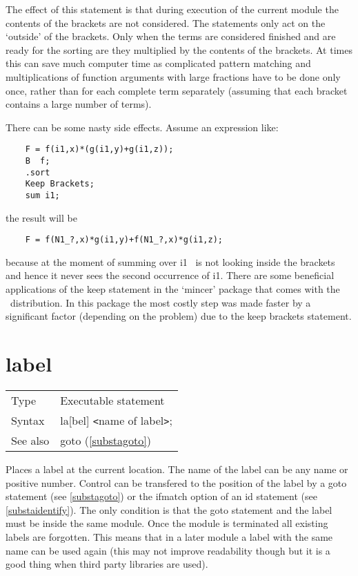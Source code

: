 \noindent The effect 
of this statement is that during execution of the current module the 
contents of the brackets are not considered. The statements only act on the 
`outside' of the brackets. Only when the terms are considered finished and 
are ready for the sorting are they multiplied by the contents of the 
brackets. At times this can save much computer time as complicated pattern 
matching and multiplications of function arguments with large fractions 
have to be done only once, rather than for each complete term separately 
(assuming that each bracket contains a large number of terms).

\noindent There can be some nasty side effects. Assume an expression like:
\begin{verbatim}
    F = f(i1,x)*(g(i1,y)+g(i1,z));
    B  f;
    .sort
    Keep Brackets;
    sum i1;
\end{verbatim}
the result will be
\begin{verbatim}
    F = f(N1_?,x)*g(i1,y)+f(N1_?,x)*g(i1,z);
\end{verbatim}
because at the moment of summing over i1 \FORM\ is not looking inside the 
brackets and hence it never sees the second occurrence of i1. There are 
some beneficial applications of the keep statement in the 
`mincer' package that comes with the \FORM\ distribution. In 
this package the most costly step was made faster by a significant factor 
(depending on the problem) due to the keep brackets statement. 
\vspace{10mm}


\section{label}
\label{substalabel}

\noindent \begin{tabular}{ll}
Type & Executable statement\\
Syntax & la[bel] {\tt<}name of label{\tt>};
\\ See also & goto (\ref{substagoto})
\end{tabular} \vspace{4mm}

\noindent Places a label at the current location. The name of 
the label can be any name or positive number. Control can be transfered to the 
position of the label by a goto statement (see 
\ref{substagoto}) or the ifmatch option of an id statement 
(see \ref{substaidentify}). The only condition is that the goto statement 
and the label must be inside the same module. Once the module is terminated 
all existing labels are forgotten. This means that in a later module a 
label with the same name can be used again (this may not improve 
readability though but it is a good thing when third party libraries are 
used). \vspace{10mm}

